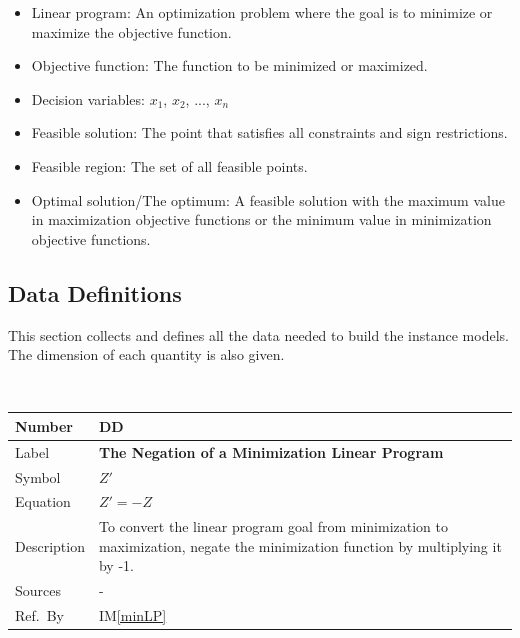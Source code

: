 \documentclass[12pt]{article}
\newcommand{\colAwidth}{0.13\textwidth}
\newcommand{\colBwidth}{0.82\textwidth}
\newcounter{defnum} %
\newcounter{datadefnum} %
\newcommand{\iref}[1]{IM\ref{#1}}
\begin{document}
\begin{itemize}
	\item Linear program: An optimization problem where the goal is to minimize 
	or maximize the objective function.
	
	\item Objective function: The function to be minimized or maximized.
	
	\item Decision variables: ${x_1}$, ${x_2}$, ..., ${x_n}$
	
	\item Feasible solution: The point that satisfies all constraints and sign 
	restrictions.
	
	\item Feasible region: The set of all feasible points.
	
	\item Optimal solution/The optimum: A feasible solution with the maximum 
	value in maximization objective functions or the minimum value in 
	minimization objective functions.
\end{itemize}

\subsection{Data Definitions} \label{sec_datadef}

This section collects and defines all the data needed to build the instance
models. The dimension of each quantity is also given.  
	
~\newline

\noindent
\begin{minipage}{\textwidth}
	\renewcommand*{\arraystretch}{1.5}
	\begin{tabular}{| p{\colAwidth} | p{\colBwidth}|}
		\hline
		\rowcolor[gray]{0.9}
		Number& DD{datadefnum}\thedatadefnum 
		\label{minToMax}\\
		\hline
		Label& \bf The Negation of a Minimization Linear Program\\
		\hline
		Symbol & $Z'$\\
		\hline
		Equation& $Z' = -Z$\\
		\hline
		Description & 
		To convert the linear program goal from minimization to maximization, 
		negate the minimization function by multiplying it by -1.
		\\
		\hline
		Sources& -\\
		\hline
		Ref.\ By & \iref{minLP}\\
		\hline
	\end{tabular}
\end{minipage}\\
\end{document}
